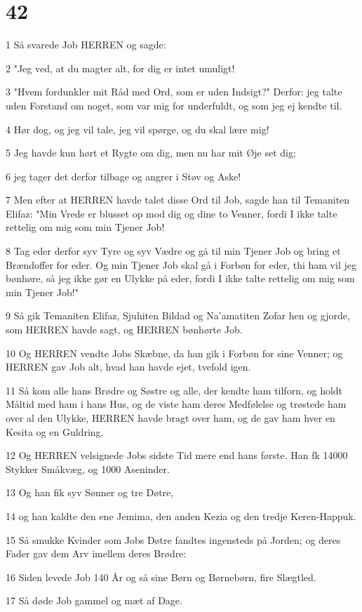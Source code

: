 \chapter{42}

\par 1 Så svarede Job HERREN og sagde:
\par 2 "Jeg ved, at du magter alt, for dig er intet umuligt!
\par 3 "Hvem fordunkler mit Råd med Ord, som er uden Indsigt?" Derfor: jeg talte uden Forstand om noget, som var mig for underfuldt, og som jeg ej kendte til.
\par 4 Hør dog, og jeg vil tale, jeg vil spørge, og du skal lære mig!
\par 5 Jeg havde kun hørt et Rygte om dig, men nu har mit Øje set dig;
\par 6 jeg tager det derfor tilbage og angrer i Støv og Aske!
\par 7 Men efter at HERREN havde talet disse Ord til Job, sagde han til Temaniten Elifaz: "Min Vrede er blusset op mod dig og dine to Venner, fordi I ikke talte rettelig om mig som min Tjener Job!
\par 8 Tag eder derfor syv Tyre og syv Vædre og gå til min Tjener Job og bring et Brændoffer for eder. Og min Tjener Job skal gå i Forbøn for eder, thi ham vil jeg bønhøre, så jeg ikke gør en Ulykke på eder, fordi I ikke talte rettelig om mig som min Tjener Job!"
\par 9 Så gik Temaniten Elifaz, Sjuhiten Bildad og Na'amatiten Zofar hen og gjorde, som HERREN havde sagt, og HERREN bønhørte Job.
\par 10 Og HERREN vendte Jobs Skæbne, da han gik i Forbøn for sine Venner; og HERREN gav Job alt, hvad han havde ejet, tvefold igen.
\par 11 Så kom alle hans Brødre og Søstre og alle, der kendte ham tilforn, og holdt Måltid med ham i hans Hus, og de viste ham deres Medfølelse og trøstede ham over al den Ulykke, HERREN havde bragt over ham, og de gav ham hver en Kesita og en Guldring.
\par 12 Og HERREN velsignede Jobs sidste Tid mere end hans første. Han fk 14000 Stykker Småkvæg, og 1000 Aseninder.
\par 13 Og han fik syv Sønner og tre Døtre,
\par 14 og han kaldte den ene Jemima, den anden Kezia og den tredje Keren-Happuk.
\par 15 Så smukke Kvinder som Jobs Døtre fandtes ingensteds på Jorden; og deres Fader gav dem Arv imellem deres Brødre:
\par 16 Siden levede Job 140 År og så sine Børn og Børnebørn, fire Slægtled.
\par 17 Så døde Job gammel og mæt af Dage.


